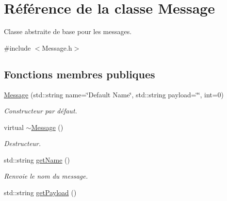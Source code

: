 \hypertarget{classMessage}{\section{Référence de la classe Message}
\label{classMessage}
}


Classe abstraite de base pour les messages.  




{\ttfamily \#include $<$Message.\-h$>$}

\subsection*{Fonctions membres publiques}
\begin{DoxyCompactItemize}
\item 
\hypertarget{classMessage_ae88f77ba817eb27909016d48bd207023}{\hyperlink{classMessage_ae88f77ba817eb27909016d48bd207023}{Message} (std\-::string name=\char`\"{}Default Name\char`\"{}, std\-::string payload=\char`\"{}\char`\"{}, int=0)}\label{classMessage_ae88f77ba817eb27909016d48bd207023}

\begin{DoxyCompactList}\small\item\em Constructeur par défaut. \end{DoxyCompactList}\item 
\hypertarget{classMessage_a3f7275462831f787a861271687bcad67}{virtual \hyperlink{classMessage_a3f7275462831f787a861271687bcad67}{$\sim$\-Message} ()}\label{classMessage_a3f7275462831f787a861271687bcad67}

\begin{DoxyCompactList}\small\item\em Destructeur. \end{DoxyCompactList}\item 
\hypertarget{classMessage_ac03b02000572b0852c574498bf138e87}{std\-::string \hyperlink{classMessage_ac03b02000572b0852c574498bf138e87}{get\-Name} ()}\label{classMessage_ac03b02000572b0852c574498bf138e87}

\begin{DoxyCompactList}\small\item\em Renvoie le nom du message. \end{DoxyCompactList}\item 
\hypertarget{classMessage_ad4276fb8ec3b78e30b13cd13a242b163}{std\-::string \hyperlink{classMessage_ad4276fb8ec3b78e30b13cd13a242b163}{get\-Payload} ()}\label{classMessage_ad4276fb8ec3b78e30b13cd13a242b163}


\end{DoxyCompactItemize}
